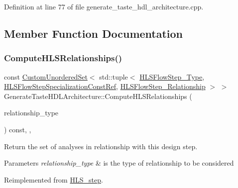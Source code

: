 Definition at line 77 of file generate\+\_\+taste\+\_\+hdl\+\_\+architecture.\+cpp.



\subsection{Member Function Documentation}
\mbox{\label{classGenerateTasteHDLArchitecture_a5599d8faaf3bda18a5b8a45875e4abb4}} 
\subsubsection{\texorpdfstring{Compute\+H\+L\+S\+Relationships()}{ComputeHLSRelationships()}}
{\footnotesize\ttfamily const \hyperlink{classCustomUnorderedSet}{Custom\+Unordered\+Set}$<$ std\+::tuple$<$ \hyperlink{hls__step_8hpp_ada16bc22905016180e26fc7e39537f8d}{H\+L\+S\+Flow\+Step\+\_\+\+Type}, \hyperlink{hls__step_8hpp_a5fdd2edf290c196531d21d68e13f0e74}{H\+L\+S\+Flow\+Step\+Specialization\+Const\+Ref}, \hyperlink{hls__step_8hpp_a3ad360b9b11e6bf0683d5562a0ceb169}{H\+L\+S\+Flow\+Step\+\_\+\+Relationship} $>$ $>$ Generate\+Taste\+H\+D\+L\+Architecture\+::\+Compute\+H\+L\+S\+Relationships (\begin{DoxyParamCaption}\item[{const \hyperlink{classDesignFlowStep_a723a3baf19ff2ceb77bc13e099d0b1b7}{Design\+Flow\+Step\+::\+Relationship\+Type}}]{relationship\+\_\+type }\end{DoxyParamCaption}) const\hspace{0.3cm}{\ttfamily [override]}, {\ttfamily [protected]}, {\ttfamily [virtual]}}



Return the set of analyses in relationship with this design step. 


\begin{DoxyParams}{Parameters}
{\em relationship\+\_\+type} & is the type of relationship to be considered \\
\hline
\end{DoxyParams}


Reimplemented from \hyperlink{classHLS__step_aed0ce8cca9a1ef18e705fc1032ad4de5}{H\+L\+S\+\_\+step}.



